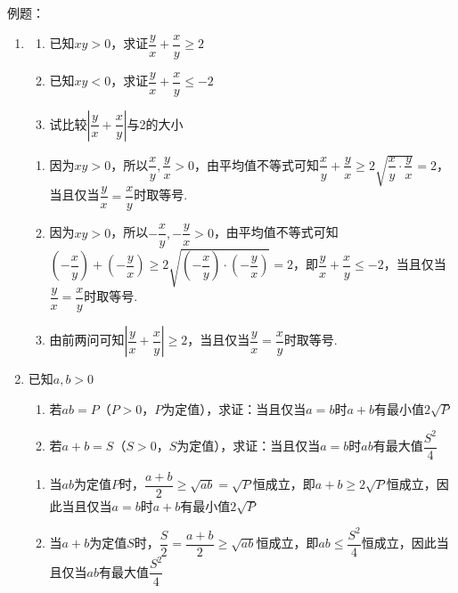 例题：
\begin{enumerate}
    \item 
    \begin{enumerate}
        \item 已知$xy > 0$，求证$\dfrac{y}{x} + \dfrac{x}{y} \geq 2$
        \item 已知$xy < 0$，求证$\dfrac{y}{x} + \dfrac{x}{y} \leq -2$
        \item 试比较$\left|\dfrac{y}{x} + \dfrac{x}{y}\right|$与2的大小
    \end{enumerate}
    \begin{jieda}
        \begin{enumerate}
            \item 因为$xy > 0$，所以$\dfrac{x}{y}, \dfrac{y}{x} > 0$，由平均值不等式可知$\dfrac{x}{y} + \dfrac{y}{x} \geq 2\sqrt{\dfrac{x}{y} \cdot \dfrac{y}{x}} = 2$，当且仅当$\dfrac{y}{x} = \dfrac{x}{y}$时取等号.
            \item 因为$xy > 0$，所以$-\dfrac{x}{y}, -\dfrac{y}{x} > 0$，由平均值不等式可知$\left(-\dfrac{x}{y}\right) + \left(-\dfrac{y}{x}\right) \geq 2\sqrt{\left(-\dfrac{x}{y}\right)\cdot \left(-\dfrac{y}{x}\right)} = 2$，即$\dfrac{y}{x} + \dfrac{x}{y} \leq -2$，当且仅当$\dfrac{y}{x} = \dfrac{x}{y}$时取等号.
            \item 由前两问可知$\left|\dfrac{y}{x} + \dfrac{x}{y}\right| \geq 2$，当且仅当$\dfrac{y}{x} = \dfrac{x}{y}$时取等号.
        \end{enumerate}
    \end{jieda}
    \item 已知$a, b > 0$
    \begin{enumerate}
        \item 若$ab = P$（$P > 0$，$P$为定值），求证：当且仅当$a = b$时$a+b$有最小值$2\sqrt{P}$
        \item 若$a+b = S$（$S > 0$，$S$为定值），求证：当且仅当$a = b$时$ab$有最大值$\dfrac{S^2}{4}$
    \end{enumerate}
    \begin{jieda}
        \begin{enumerate}
            \item 当$ab$为定值$P$时，$\dfrac{a+b}{2} \geq \sqrt{ab} = \sqrt{P}$恒成立，即$a+b \geq 2\sqrt{P}$恒成立，因此当且仅当$a = b$时$a+b$有最小值$2\sqrt{P}$
            \item 当$a+b$为定值$S$时，$\dfrac{S}{2} = \dfrac{a+b}{2} \geq \sqrt{ab}$恒成立，即$ab \leq \dfrac{S^2}{4}$恒成立，因此当且仅当$ab$有最大值$\dfrac{S^2}{4}$
        \end{enumerate}

\end{jieda}
\end{enumerate}
